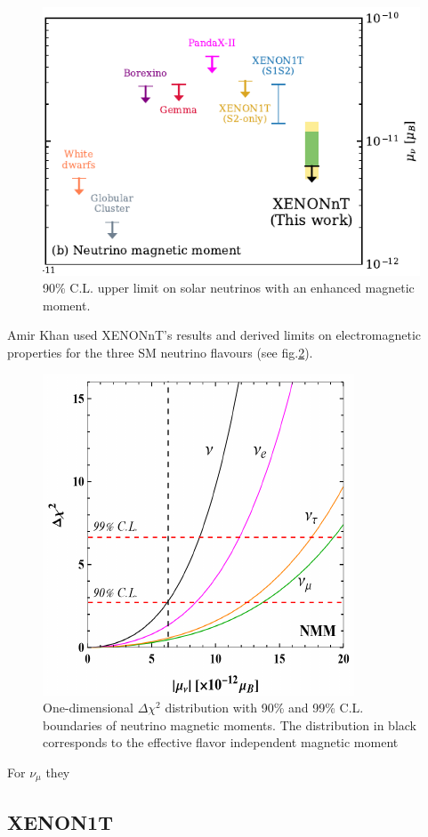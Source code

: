 \documentclass[12pt]{article}
\begin{document}
\begin{figure}
    \centering
    \hspace*{1.5cm}\includegraphics[width=.7\textwidth]{XENONnTExpResultsComparison.pdf}
    \caption{90\% C.L. upper limit on solar neutrinos with an enhanced magnetic moment.}
    \label{fig:XENONnTResults}
\end{figure}
Amir Khan used\cite{Khan:2022bel} XENONnT's results and derived limits on electromagnetic properties for the three SM neutrino flavours (see fig.\ref{fig:XENONnTFit_Khan}).
\begin{figure}
    \centering
    \includegraphics[width=.65\textwidth]{XENONnTFitForNuMM_Khan.pdf}
    \caption{One-dimensional $\Delta\chi^2$ distribution with 90\% and 99\% C.L. boundaries of neutrino magnetic moments. The distribution in black corresponds to the effective flavor independent magnetic moment}
    \label{fig:XENONnTFit_Khan}
\end{figure}
For $\nu_\mu$ they 

\subsection{XENON1T}
\end{document}
